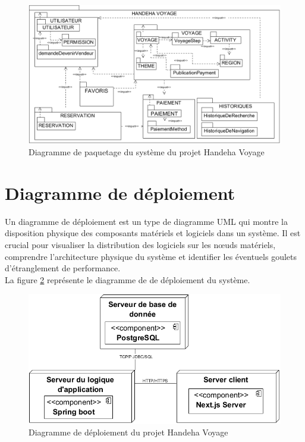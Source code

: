 \documentclass[12pt]{report}
\begin{document}
			\begin{figure}[h]
				\centering
				\includegraphics[width=\textwidth]{DPaquetage.jpg}
				\caption{Diagramme de paquetage du système du projet Handeha Voyage}
				\label{fig:DPaquetage}
			\end{figure}
			\clearpage


			\section{Diagramme de déploiement}
			
			\hspace{15pt} Un diagramme de déploiement est un type de diagramme UML qui montre la disposition physique des composants matériels et logiciels dans un système. Il est crucial pour visualiser la distribution des logiciels sur les nœuds matériels, comprendre l'architecture physique du système et identifier les éventuels goulets d'étranglement de performance.\\


			La figure \ref{fig:DDep} représente le diagramme de  de déploiement du système.

			\begin{figure}[h]
				\centering
				\includegraphics[width=\textwidth]{DDep.jpg}
				\caption{Diagramme  de déploiement du projet Handeha Voyage}
				\label{fig:DDep}
			\end{figure}
			\clearpage
\end{document}
